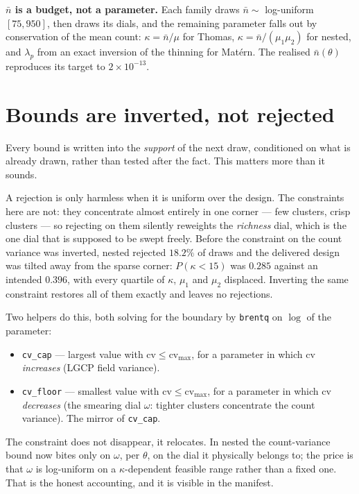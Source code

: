 \documentclass[11pt]{article}
\newcommand{\nb}{\bar n}
\newcommand{\cvmax}{\mathrm{cv}_{\max}}
\newcommand{\code}[1]{\texttt{#1}}
\begin{document}
\textbf{$\nb$ is a budget, not a parameter.} Each family draws $\nb\sim$ log-uniform$[75,950]$, then draws its dials, and the remaining parameter falls out by conservation of the mean count: $\kappa=\nb/\mu$ for Thomas, $\kappa=\nb/(\mu_1\mu_2)$ for nested, and $\lambda_p$ from an exact inversion of the thinning for Mat\'ern. The realised $\nb(\theta)$ reproduces its target to $2\times10^{-13}$.

\section{Bounds are inverted, not rejected}
Every bound is written into the \emph{support} of the next draw, conditioned on what is already drawn, rather than tested after the fact. This matters more than it sounds.

A rejection is only harmless when it is uniform over the design. The constraints here are not: they concentrate almost entirely in one corner --- few clusters, crisp clusters --- so rejecting on them silently reweights the \emph{richness} dial, which is the one dial that is supposed to be swept freely. Before the constraint on the count variance was inverted, nested rejected $18.2\%$ of draws and the delivered design was tilted away from the sparse corner: $P(\kappa<15)$ was $0.285$ against an intended $0.396$, with every quartile of $\kappa$, $\mu_1$ and $\mu_2$ displaced. Inverting the same constraint restores all of them exactly and leaves no rejections.

Two helpers do this, both solving for the boundary by \code{brentq} on $\log$ of the parameter:
\begin{itemize}
  \item \code{cv\_cap} --- largest value with $\mathrm{cv}\le\cvmax$, for a parameter in which cv \emph{increases} (LGCP field variance).
  \item \code{cv\_floor} --- smallest value with $\mathrm{cv}\le\cvmax$, for a parameter in which cv \emph{decreases} (the smearing dial $\omega$: tighter clusters concentrate the count variance). The mirror of \code{cv\_cap}.
\end{itemize}
The constraint does not disappear, it relocates. In nested the count-variance bound now bites only on $\omega$, per $\theta$, on the dial it physically belongs to; the price is that $\omega$ is log-uniform on a $\kappa$-dependent feasible range rather than a fixed one. That is the honest accounting, and it is visible in the manifest.
\end{document}
